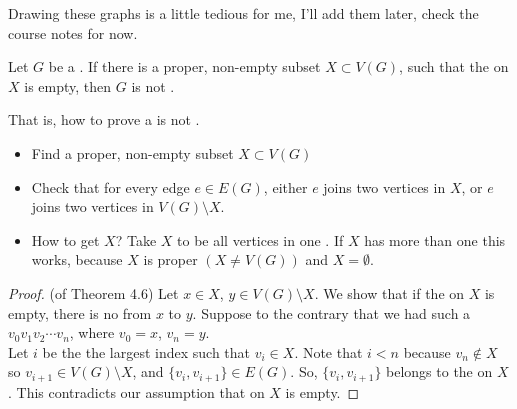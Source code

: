 \documentclass[english, 11pt]{article}
\begin{document}
\begin{note}
  Drawing these graphs is a little tedious for me, I'll add them later, check the course notes for now.
\end{note}

\begin{thrm}
 Let $G$ be a . If there is a proper, non-empty subset $X \subset V(G)$, such that the  on $X$ is empty, then $G$ is not .
\end{thrm}

That is, how to prove a  is not .
\begin{itemize}
  \item Find a proper, non-empty subset $X \subset V(G)$
  \item Check that for every edge $e \in E(G)$, either $e$ joins two vertices in $X$, or $e$ joins two vertices in $V(G) \setminus X$.
  \item How to get $X$? Take $X$ to be all vertices in one . If $X$ has more than one  this works, because $X$ is proper $(X \not = V(G))$ and $X = \emptyset$.
\end{itemize}

\begin{proof}(of Theorem 4.6)
  Let $x \in X$, $y \in V(G) \setminus X$. We show that if the  on $X$ is empty, there is no  from $x$ to $y$. Suppose to the contrary that we had such a  $v_0v_1v_2\cdots v_n$, where $v_0 = x$, $v_n = y$. \\
  Let $i$ be the the largest index such that $v_i \in X$. Note that $i < n$ because $v_n \not \in X$ so $v_{i+1} \in V(G) \setminus X$, and $\{v_i, v_{i+1}\} \in E(G)$. So, $\{v_i, v_{i+1} \}$ belongs to the  on $X$. This contradicts our assumption that  on $X$ is empty.
\end{proof}
\end{document}
